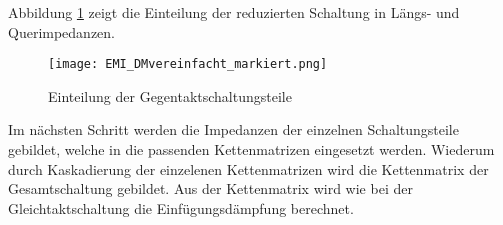 Abbildung \ref{fig:dmschaltungEingeteilt} zeigt die Einteilung der reduzierten Schaltung in Längs- und Querimpedanzen.
 
\begin{figure}[H]
		\centering
		\texttt{[image: EMI\_DMvereinfacht\_markiert.png]}
		\caption{Einteilung der Gegentaktschaltungsteile}
		\label{fig:dmschaltungEingeteilt}
\end{figure}

Im nächsten Schritt werden die Impedanzen der einzelnen Schaltungsteile gebildet, welche in die passenden Kettenmatrizen eingesetzt werden.
Wiederum durch Kaskadierung der einzelenen Kettenmatrizen wird die Kettenmatrix der Gesamtschaltung gebildet. Aus der Kettenmatrix wird wie bei der Gleichtaktschaltung die Einfügungsdämpfung berechnet.


